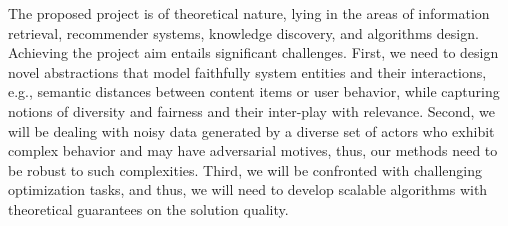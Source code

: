 \documentclass[a4paper,11pt]{article}
\begin{document}
The proposed project is of theoretical nature, 
lying in the areas of information retrieval, recommender systems,  
knowledge discovery, and algorithms design. 
Achieving the project aim entails significant challenges. 
First, we need to design novel abstractions that model faithfully system entities and their interactions, 
e.g., semantic distances between content items or user behavior, 
while capturing notions of diversity and fairness and their inter-play with relevance.
Second, we will be dealing with noisy data generated by a diverse set of actors
who exhibit complex behavior and may have adversarial motives, 
thus, our methods need to be robust to such complexities.
Third, we will be confronted with challenging optimization tasks, and thus, 
we will need to develop scalable algorithms with theoretical guarantees on the solution quality.

\iffalse
\medskip
\noindent
\hspace{-3mm}\colorbox{verylightmagenta}{
\begin{minipage}{\textwidth}
{\bf Hypothesis:} 
We postulate that modern information-access systems suffer from lack of diversity 
and unfair representation of content. 
We hypothesize that such deficiencies can be mitigated by formulating novel abstractions
and designing rigorous computational methods to support individuals in 
maximizing diversity and improving fairness of the available content. 
\end{minipage}}
\fi
\end{document}
